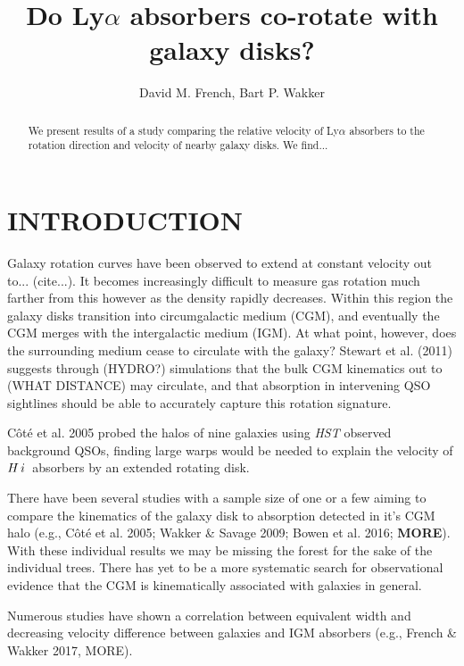 \documentclass[iop]{emulateapj-rtx4}
\newcommand{\HI}{$H\,{\sc i}$}
\begin{document}
\title{Do Ly$\alpha$ absorbers co-rotate with galaxy disks?}

\author{David M. French, Bart P. Wakker}


\begin{abstract}

We present results of a study comparing the relative velocity of Ly$\alpha$ absorbers to the rotation direction and velocity of nearby galaxy disks. We find...

\end{abstract}




\section{INTRODUCTION}
Galaxy rotation curves have been observed to extend at constant velocity out to... (cite...). It becomes increasingly difficult to measure gas rotation much farther from this however as the density rapidly decreases. Within this region the galaxy disks transition into circumgalactic medium (CGM), and eventually the CGM merges with the intergalactic medium (IGM). At what point, however, does the surrounding medium cease to circulate with the galaxy? Stewart et al. (2011) suggests through (HYDRO?) simulations that the bulk CGM kinematics out to (WHAT DISTANCE) may circulate, and that absorption in intervening QSO sightlines should be able to accurately capture this rotation signature.

C\^{o}t\'{e} et al. 2005 probed the halos of nine galaxies using \emph{HST} observed background QSOs, finding large warps would be needed to explain the velocity of \HI~absorbers by an extended rotating disk.

There have been several studies with a sample size of one or a few aiming to compare the kinematics of the galaxy disk to absorption detected in it's CGM halo (e.g., C\^{o}t\'{e} et al. 2005; Wakker \& Savage 2009; Bowen et al. 2016; \textbf{MORE}). With these individual results we may be missing the forest for the sake of the individual trees. There has yet to be a more systematic search for observational evidence that the CGM is kinematically associated with galaxies in general.

Numerous studies have shown a correlation between equivalent width and decreasing velocity difference between galaxies and IGM absorbers (e.g., French \& Wakker 2017, MORE).
\end{document}
